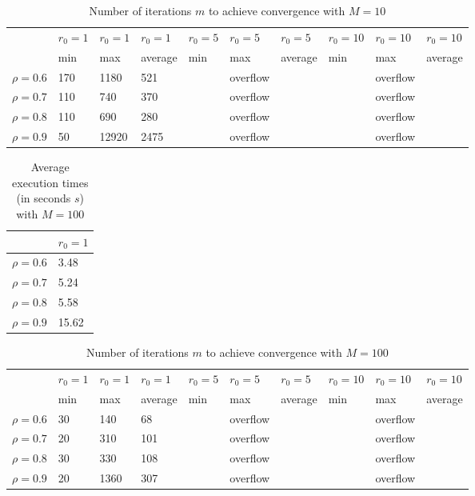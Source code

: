 \documentclass[a4paper,11pt,openright]{report}
\begin{document}
\begin{table}[H]
\centering
\addtolength{\leftskip}{-1.5cm}
\addtolength{\rightskip}{-1.5cm}
\begin{tabular}{|c|lllllllll|}
\hline
$ $ & $r_0 = 1$ & $r_0 = 1$ & $r_0 = 1$ & $r_0 = 5$ & $r_0 = 5$ & $r_0 = 5$ & $r_0 = 10$ & $r_0 = 10$ & $r_0 = 10$  \\
$ $ & min & max & average & min & max & average & min & max & average \\ 
\hline
$\rho = 0.6$ & 170 & 1180 & 521 &  & overflow &  &  & overflow &  \\

$\rho = 0.7$ & 110 & 740 & 370 &  & overflow &  &  & overflow &  \\

$\rho = 0.8$ & 110 & 690 & 280 &  & overflow &  &  & overflow & \\

$\rho = 0.9$ & 50 & 12920 & 2475 &  & overflow &  &  & overflow & \\
\hline
\end{tabular}
\caption{Number of iterations $m$ to achieve convergence with $M = 10$}
\end{table}
\begin{table}[H]
\centering
\addtolength{\leftskip}{-1.5cm}
\addtolength{\rightskip}{-1.5cm}
\begin{tabular}{|c|l|}
\hline
$ $ & $r_0 = 1$  \\
\hline
$\rho = 0.6$ & 3.48 \\

$\rho = 0.7$ & 5.24 \\

$\rho = 0.8$ & 5.58  \\

$\rho = 0.9$ & 15.62 \\
\hline
\end{tabular}
\caption{Average execution
 times (in seconds $s$) with $M = 100$}
\end{table}
\begin{table}[H]
\centering
\addtolength{\leftskip}{-1.5cm}
\addtolength{\rightskip}{-1.5cm}
\begin{tabular}{|c|lllllllll|}
\hline
$ $ & $r_0 = 1$ & $r_0 = 1$ & $r_0 = 1$ & $r_0 = 5$ & $r_0 = 5$ & $r_0 = 5$ & $r_0 = 10$ & $r_0 = 10$ & $r_0 = 10$  \\
$ $ & min & max & average & min & max & average & min & max & average \\ 
\hline
$\rho = 0.6$ & 30 & 140 & 68 &  & overflow &  &  & overflow &  \\

$\rho = 0.7$ & 20 & 310 & 101 &  & overflow &  &  & overflow &  \\

$\rho = 0.8$ & 30 & 330 & 108 &  & overflow &  &  & overflow & \\

$\rho = 0.9$ & 20 & 1360 & 307 &  & overflow &  &  & overflow & \\
\hline
\end{tabular}
\caption{Number of iterations $m$ to achieve convergence with $M = 100$}
\end{table}
\end{document}
